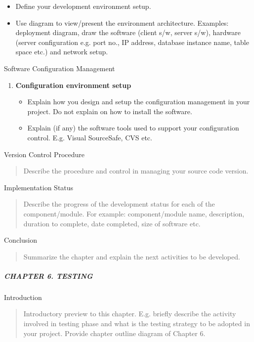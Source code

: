 \begin{itemize}
\item
  Define your development environment setup.
\item
  Use diagram to view/present the environment architecture. Examples:
  deployment diagram, draw the software (client s/w, server s/w),
  hardware (server configuration e.g. port no., IP address, database
  instance name, table space etc.) and network setup.
\end{itemize}

Software Configuration Management

\begin{enumerate}
\def\labelenumi{\arabic{enumi}.}
\item
  \textbf{Configuration environment setup}

  \begin{itemize}
  \item
    Explain how you design and setup the configuration management in
    your project. Do not explain on how to install the software.
  \item
    Explain (if any) the software tools used to support your
    configuration control. E.g. Visual SourceSafe, CVS etc.
  \end{itemize}
\end{enumerate}

Version Control Procedure

\begin{quote}
Describe the procedure and control in managing your source code version.
\end{quote}

Implementation Status

\begin{quote}
Describe the progress of the development status for each of the
component/module. For example: component/module name, description,
duration to complete, date completed, size of software etc.
\end{quote}

Conclusion

\begin{quote}
Summarize the chapter and explain the next activities to be developed.
\end{quote}

\subparagraph{CHAPTER 6. TESTING}\label{chapter-6.-testing}

Introduction

\begin{quote}
Introductory preview to this chapter. E.g. briefly describe the activity
involved in testing phase and what is the testing strategy to be adopted
in your project. Provide chapter outline diagram of Chapter 6.
\end{quote}

